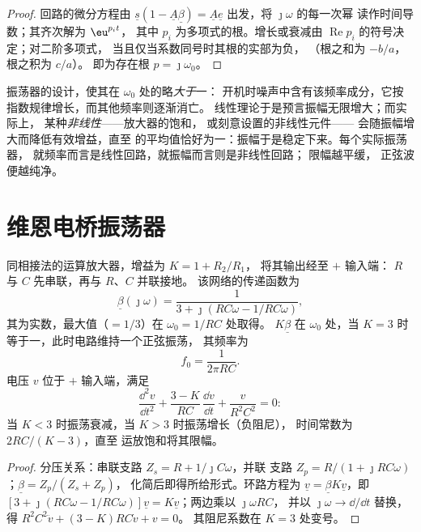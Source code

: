 \begin{proof}
回路的微分方程由 $\underline s(1 -
\underline A\underline\beta) = \underline A\underline e$ 出发，将 $\jmath\omega$ 的每一次幂
读作时间导数；其齐次解为 $\eu^{p_it}$，
其中 $p_i$ 为多项式的根。增长或衰减由
$\operatorname{Re}p_i$ 的符号决定；对二阶多项式，
当且仅当系数同号时其根的实部为负，
（根之和为 $-b/a$，根之积为 $c/a$）。
即为存在根 $p = \jmath\omega_0$。
\end{proof}

\begin{remark}[振荡器的起振与停振]\label{rem:b2:feedback-oscillators:start}
振荡器的设计，使其在 $\omega_0$ 处的略\emph{大于}一：
开机时噪声中含有该频率成分，它按指数规律增长，而其他频率则逐渐消亡。
线性理论于是预言振幅无限增大；而实际上，
某种\emph{非线性}——放大器的饱和，
或刻意设置的非线性元件——
会随振幅增大而降低有效增益，直至
的平均值恰好为一：振幅于是稳定下来。每个实际振荡器，
就频率而言是线性回路，就振幅而言则是非线性回路；
限幅越平缓，
正弦波便越纯净。
\end{remark}

\section{维恩电桥振荡器}

\begin{proposition}[维恩电桥振荡器]\label{prop:b2:feedback-oscillators:wien}
同相接法的运算放大器，增益为 $K = 1 + R_2/R_1$，
将其输出经\emph{}至 $+$ 输入端：
$R$ 与 $C$ 先串联，再与 $R$、$C$ 并联接地。
该网络的传递函数为
\[
\underline\beta(\jmath\omega) = \frac1{3 + \jmath(RC\omega - 1/RC\omega)} ,
\]
其为实数，最大值（$= 1/3$）在 $\omega_0 = 1/RC$ 处取得。 $K\underline\beta$
在 $\omega_0$ 处，当 $K = 3$ 时等于一，此时电路维持一个正弦振荡，
其频率为
\[
f_0 = \frac1{2\pi RC} .
\]
电压 $v$ 位于 $+$ 输入端，满足
\[
\frac{\dd^2v}{\dd t^2} + \frac{3 - K}{RC}\,\frac{\dd v}{\dd t} + \frac{v}{R^2C^2} = 0 :
\]
当 $K < 3$ 时振荡衰减，当 $K > 3$ 时振荡增长（负阻尼），
时间常数为 $2RC/(K - 3)$，直至
运放饱和将其限幅。
\end{proposition}

\begin{proof}
分压关系：串联支路 $Z_s = R + 1/\jmath C\omega$，并联
支路 $Z_p = R/(1 + \jmath RC\omega)$；$\underline\beta = Z_p/(Z_s + Z_p)$，
化简后即得所给形式。环路方程为 $\underline v = \underline\beta K\underline v$，即
$[3 + \jmath(RC\omega - 1/RC\omega)]\underline v = K\underline v$；两边乘以 $\jmath\omega RC$，
并以 $\jmath\omega \to \dd/\dd t$ 替换，得 $R^2C^2\ddot v + (3 - K)RC\dot v + v = 0$。
其阻尼系数在 $K = 3$ 处变号。
\end{proof}

